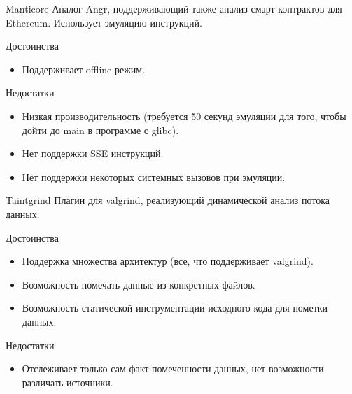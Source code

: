 \documentclass[10pt]{beamer}
\begin{document}
\begin{frame}{Manticore}
    Аналог Angr, поддерживающий также анализ смарт-контрактов для Ethereum. Использует эмуляцию инструкций.
    \begin{block}{Достоинства}
      \begin{itemize}
        \item Поддерживает offline-режим. %
      \end{itemize}
    \end{block}
        \begin{block}{Недостатки}
          \begin{itemize}
      \item Низкая производительность (требуется 50 секунд эмуляции для того, чтобы дойти до main в программе с glibc).
      \item Нет поддержки SSE инструкций.
      \item Нет поддержки некоторых системных вызовов при эмуляции.
      \end{itemize}
    \end{block}
\end{frame}

\begin{frame}{Taintgrind}
    Плагин для valgrind, реализующий динамической анализ потока данных.
    \begin{block}{Достоинства}
      \begin{itemize}
        \item Поддержка множества архитектур (все, что поддерживает valgrind).
        \item Возможность помечать данные из конкретных файлов.
        \item Возможность статической инструментации исходного кода для пометки данных.
      \end{itemize}
    \end{block}
        \begin{block}{Недостатки}
          \begin{itemize}
      \item Отслеживает только сам факт помеченности данных, нет возможности различать источники.
      \end{itemize}
    \end{block}
\end{frame}
\end{document}
